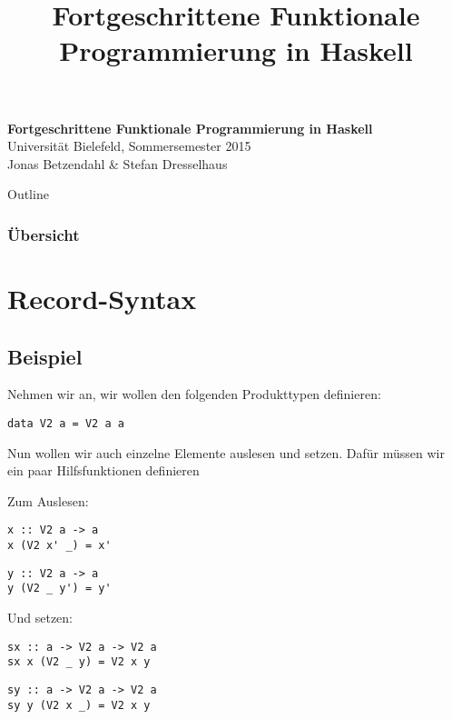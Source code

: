\documentclass{beamer}
\title{Fortgeschrittene Funktionale Programmierung in Haskell}
\begin{document}
  

  \begin{frame}
  \begin{center}
    \huge\textbf{Fortgeschrittene Funktionale Programmierung in Haskell}\\ \bigskip
    \LARGE Universität Bielefeld, Sommersemester 2015\\ \bigskip
    \large Jonas Betzendahl \& Stefan Dresselhaus
    \end{center}
  \end{frame}

\begin{frame}[allowframebreaks]{Outline}
\frametitle{Übersicht}
\tableofcontents[hideallsubsections]
\end{frame}

\section{Record-Syntax}

\subsection{Beispiel}

\begin{frame}[fragile]
Nehmen wir an, wir wollen den folgenden Produkttypen definieren:
\begin{verbatim}
data V2 a = V2 a a
\end{verbatim}
\pause
Nun wollen wir auch einzelne Elemente auslesen und setzen. Dafür müssen wir ein paar Hilfsfunktionen definieren
\end{frame}

\begin{frame}[fragile]
Zum Auslesen:
\pause
\begin{verbatim}
x :: V2 a -> a
x (V2 x' _) = x'
\end{verbatim}
\pause
\begin{verbatim}
y :: V2 a -> a
y (V2 _ y') = y'
\end{verbatim}
\pause
Und setzen:
\pause
\begin{verbatim}
sx :: a -> V2 a -> V2 a
sx x (V2 _ y) = V2 x y
\end{verbatim}
\pause
\begin{verbatim}
sy :: a -> V2 a -> V2 a
sy y (V2 x _) = V2 x y
\end{verbatim}
\end{frame}
\end{document}
